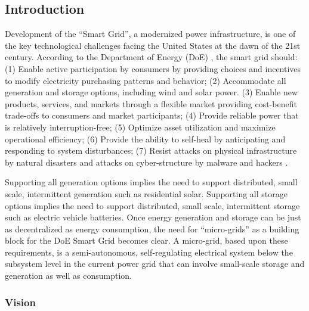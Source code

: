 
\subsection{Introduction}

Development of the ``Smart Grid'', a modernized power infrastructure, is
one of the key technological challenges facing the United States at the
dawn of the 21st century. According to the Department of Energy (DoE) , the smart
grid should: (1) Enable active participation by consumers by providing
choices and incentives to modify electricity purchasing patterns and
behavior; (2) Accommodate all generation and storage options, including
wind and solar power.  (3) Enable new products, services, and markets
through a flexible market providing cost-benefit trade-offs to consumers
and market participants; (4) Provide reliable power that is relatively
interruption-free; (5) Optimize asset utilization and maximize operational
efficiency; (6) Provide the ability to self-heal by anticipating and
responding to system disturbances; (7) Resist attacks on physical
infrastructure by natural disasters and attacks on cyber-structure by
malware and hackers \cite{NETL:GridCharacteristics}.

Supporting all generation options implies the need to support distributed,
small scale, intermittent generation such as residential solar.  Supporting
all storage options implies the need to support distributed, small scale,
intermittent storage such as electric vehicle batteries.  Once energy
generation and storage can be just as decentralized as energy consumption,
the need for ``micro-grids'' as a building block for the DoE Smart Grid
becomes clear.  A micro-grid, based upon these requirements, is a
semi-autonomous, self-regulating electrical system below the subsystem
level in the current power grid that can involve small-scale storage and
generation as well as consumption.

\subsubsection{Vision}
\label{sec:vision}

